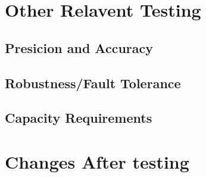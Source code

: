 \documentclass{scrreprt}
\begin{document}
\chapter{Other Relavent Testing}
\section{Presicion and Accuracy}
\section{Robustness/Fault Tolerance}
\section{Capacity Requirements}
\section{}
\chapter{Changes After testing}
\end{document}
